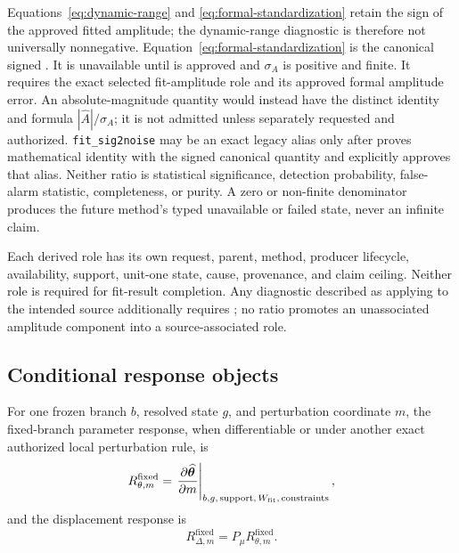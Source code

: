 Equations~\ref{eq:dynamic-range} and \ref{eq:formal-standardization} retain
the sign of the approved fitted amplitude; the dynamic-range diagnostic is
therefore not universally nonnegative. Equation~\ref{eq:formal-standardization}
is the canonical signed
. It is unavailable until
\FormalMethod{} is approved and $\sigma_A$ is positive and finite. It requires
the exact selected fit-amplitude role and its approved formal amplitude error.
An absolute-magnitude quantity would instead have the distinct identity
 and formula
$|\widehat A|/\sigma_A$; it is not admitted unless separately requested and
authorized.
\texttt{fit\_sig2noise} may be an exact legacy alias only after \FormalMethod{}
proves mathematical identity with the signed canonical quantity and explicitly
approves that alias. Neither ratio is statistical
significance, detection probability, false-alarm statistic, completeness, or
purity. A zero or non-finite denominator produces the future method's typed
unavailable or failed state, never an infinite claim.

Each derived role has its own request, parent, method, producer lifecycle,
availability, support, unit-one state, cause, provenance, and claim ceiling.
Neither role is required for fit-result completion. Any diagnostic described
as applying to the intended source additionally requires
; no ratio promotes an
unassociated amplitude component into a source-associated role.

\subsection{Conditional response objects}\label{sec:response-equations}

For one frozen branch $b$, resolved state $g$, and perturbation coordinate
$m$, the fixed-branch parameter response, when differentiable or under another
exact authorized local perturbation rule, is
\begin{equation}
R^{\mathrm{fixed}}_{\theta,m}
=\left.\frac{\partial\widehat{\boldsymbol{\theta}}}{\partial m}\right|_{b,g,\,
\mathrm{support},\,W_{\mathrm{fit}},\,\mathrm{constraints}} ,
\label{eq:fixed-response}
\end{equation}
and the displacement response is
\begin{equation}
R^{\mathrm{fixed}}_{\Delta,m}=P_{\mu}R^{\mathrm{fixed}}_{\theta,m}.
\label{eq:fixed-displacement-response}
\end{equation}

